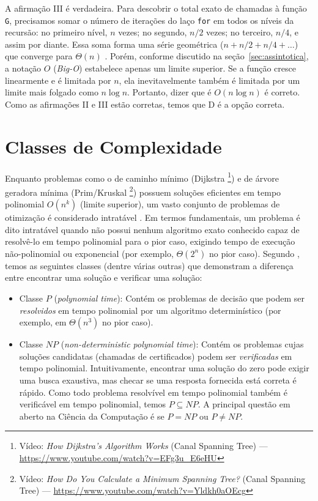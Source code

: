 \documentclass[12pt,a4paper]{article}
\begin{document}
A afirmação III é verdadeira.
Para descobrir o total exato de chamadas à função \texttt{G},
precisamos somar o número de iterações do laço \texttt{for} em todos os níveis da recursão:
no primeiro nível, $n$ vezes; no segundo, $n/2$ vezes; no terceiro, $n/4$, e assim por diante.
Essa soma forma uma série geométrica ($n + n/2 + n/4 + \dots$) que converge para $\Theta(n)$ \parencite[seç.~A.1]{clrs2022}.
Porém, conforme discutido na seção~\ref{sec:assintotica}, a notação $O$ (\textit{Big-O}) estabelece apenas um limite superior.
Se a função cresce linearmente e é limitada por $n$,
ela inevitavelmente também é limitada por um limite mais folgado como $n \log n$.
Portanto, dizer que é $O(n \log n)$ é correto.
Como as afirmações II e III estão corretas, temos que D é a opção correta.

\section{Classes de Complexidade}\label{sec:class}
Enquanto problemas como o de caminho mínimo (Dijkstra%
\footnote{Vídeo: \textit{How Dijkstra's Algorithm Works} (Canal Spanning Tree) --- \url{https://www.youtube.com/watch?v=EFg3u_E6eHU}})
e de árvore geradora mínima (Prim/Kruskal%
\footnote{Vídeo: \textit{How Do You Calculate a Minimum Spanning Tree?} (Canal Spanning Tree) --- \url{https://www.youtube.com/watch?v=Yldkh0aOEcg}})
possuem soluções eficientes em tempo polinomial $O(n^k)$ (limite superior),
um vasto conjunto de problemas de otimização é considerado intratável \parencite[cap.~21--22,34]{clrs2022}.
Em termos fundamentais, um problema é dito intratável quando não possui nenhum algoritmo exato conhecido capaz de resolvê-lo em tempo polinomial
para o pior caso, exigindo tempo de execução não-polinomial ou exponencial (por exemplo, $\Theta(2^n)$ no pior caso).
Segundo \textcite[cap.~34]{clrs2022}, temos as seguintes classes (dentre várias outras) que demonstram a diferença entre encontrar uma solução e verificar uma solução:
\begin{itemize}
    \item Classe $P$ (\textit{polynomial time}):
    Contém os problemas de decisão que podem ser \emph{resolvidos} em tempo polinomial por um algoritmo determinístico (por exemplo, em $\Theta(n^3)$ no pior caso).
    \item Classe $NP$ (\textit{non-deterministic polynomial time}):
    Contém os problemas cujas soluções candidatas (chamadas de certificados) podem ser \emph{verificadas} em tempo polinomial.
    Intuitivamente, encontrar uma solução do zero pode exigir uma busca exaustiva, mas checar se uma resposta fornecida está correta é rápido.
    Como todo problema resolvível em tempo polinomial também é verificável em tempo polinomial, temos $P \subseteq NP$.
    A principal questão em aberto na Ciência da Computação é se $P = NP$ ou $P \neq NP$.
\end{itemize}
\end{document}
